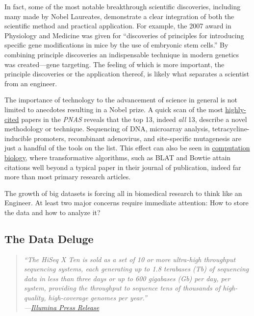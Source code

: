     In fact, some of the most notable breakthrough scientific discoveries, including many made by Nobel Laureates, demonstrate a clear integration of both the scientific method and practical application. For example, the 2007 award in Physiology and Medicine was given for ``discoveries of principles for introducing specific gene modifications in mice by the use of embryonic stem cells.'' By combining principle discoveries an indispensable technique in modern genetics was created---gene targeting. The feeling of which is more important, the principle discoveries or the application thereof, is likely what separates a scientist from an engineer.

    The importance of technology to the advancement of science in general is not limited to anecdotes resulting in a Nobel prize. A quick scan of the most \href{http://www.pnas.org/reports/most-cited}{highly-cited} papers in the \textit{PNAS} reveals that the top 13, indeed \textit{all} 13, describe a novel methodology or technique. Sequencing of DNA, microarray analysis, tetracycline-inducible promoters, recombinant adenovirus, and site-specific mutagenesis are just a handful of the tools on the list. This effect can also be seen in \href{http://simplystatistics.org/2014/04/07/writing-good-software-can-have-more-impact-than-publishing-in-high-impact-journals-for-genomic-statisticians/}{computation biology}, where transformative algorithms, such as BLAT \citep{Altschul1990} and Bowtie \citep{Langmead2009} attain citations well beyond a typical paper in their journal of publication, indeed far more than most primary research articles.

    The growth of big datasets is forcing all in biomedical research to think like an Engineer. At least two major concerns require immediate attention: How to store the data and how to analyze it?

  \subsection{The Data Deluge}
    \label{Disc:subsec:Dealing with Data Deluge}

    \begin{quote}
      \itshape
      \singlespacing
      ``The HiSeq X Ten is sold as a set of 10 or more ultra-high throughput sequencing systems, each generating up to 1.8 terabases (Tb) of sequencing data in less than three days or up to 600 gigabases (Gb) per day, per system, providing the throughput to sequence tens of thousands of high-quality, high-coverage genomes per year.'' \\
      \indent ---\href{http://bit.ly/PZpegZ}{Illumina Press Release}
      \end{quote}

